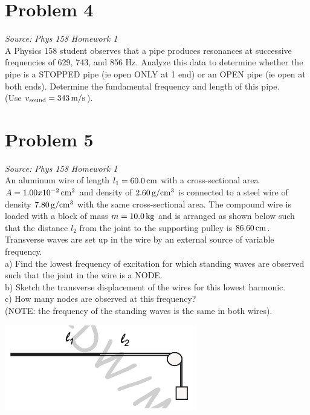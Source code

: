 \documentclass[11pt, fleqn]{article}
\begin{document}
\section*{Problem 4}
\textit{Source: Phys 158 Homework 1}\\
A Physics 158 student observes that a pipe produces resonances at successive frequencies of 629, 743, and 856 Hz. Analyze this data to determine whether the pipe is a STOPPED pipe (ie open ONLY at 1 end)
or an OPEN pipe (ie open at both ends). Determine the fundamental frequency and length of this pipe.\\
(Use $v_\text{sound} = 343 \,\mathrm{m/s}$).

\section*{Problem 5}
\textit{Source: Phys 158 Homework 1}\\
An aluminum wire of length $l_1 = 60.0 \,\mathrm{cm}$ with a cross-sectional area $A = 1.00 x 10^{-2} \,\mathrm{cm^2}$ 
and density of $2.60 \,\mathrm{g/cm^3}$ is connected to a steel wire of density $7.80 \,\mathrm{g/cm^3}$ with the same cross-sectional area. The
compound wire is loaded with a block of mass $m=10.0 \,\mathrm{kg}$ and is arranged as shown below such that the
distance $l_2$ from the joint to the supporting pulley is $86.60 \,\mathrm{cm}$. Transverse waves are set up in the wire by
an external source of variable frequency.\\
a) Find the lowest frequency of excitation for which standing
waves are observed such that the joint in the wire is a NODE.\\
b) Sketch the transverse displacement of the
wires for this lowest harmonic.\\
c) How many nodes are observed at this frequency?\\
(NOTE: the frequency of the standing waves is the same in both wires).\\
\centerline{\includegraphics{Images/CompoundWire.png}}
\end{document}
